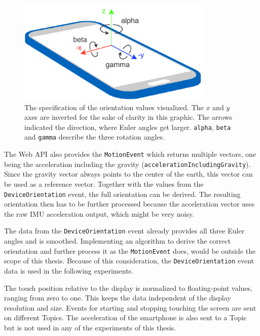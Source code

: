 \begin{figure}[H]
	\centering
	\includegraphics[height=5cm]{figures/implementation/webapi_device_orientation.pdf}
	\caption[Smart device coordinate system and orientation values]{The specification of the orientation values visualized. The \(x\) and \(y\) axes are inverted for the sake of clarity in this graphic. The arrows indicated the direction, where Euler angles get larger. \lstinline{alpha}, \lstinline{beta} and \lstinline{gamma} describe the three rotation angles.}\label{fig:webapi-device-orientation}
\end{figure}

The Web \gls{API} also provides the \lstinline{MotionEvent} which returns multiple vectors, one being the acceleration including the gravity (\lstinline{accelerationIncludingGravity}). Since the gravity vector always points to the center of the earth, this vector can be used as a reference vector. Together with the values from the \lstinline{DeviceOrientation} event, the full orientation can be derived. The resulting orientation then has to be further processed because the acceleration vector uses the raw \gls{IMU} acceleration output, which might be very noisy.

The data from the \lstinline{DeviceOrientation} event already provides all three Euler angles and is smoothed. Implementing an algorithm to derive the correct orientation and further process it as the \lstinline{MotionEvent} does, would be outside the scope of this thesis. Because of this consideration, the \lstinline{DeviceOrientation} event data is used in the following experiments.

The touch position relative to the display is normalized to floating-point values,  ranging from zero to one. This keeps the data independent of the display resolution and size. Events for starting and stopping touching the screen are sent on different Topics. The acceleration of the smartphone is also sent to a Topic but is not used in any of the experiments of this thesis.


